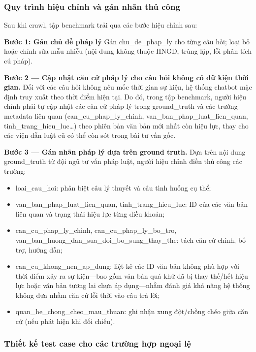 \documentclass[../DoAn.tex]{subfiles}
\begin{document}
\subsubsection{Quy trình hiệu chỉnh và gán nhãn thủ công}

Sau khi crawl, tập benchmark trải qua các bước hiệu chỉnh sau:

\textbf{Bước 1: Gán chủ đề pháp lý}
Gán chu\_de\_phap\_ly cho từng câu hỏi; loại bỏ hoặc chỉnh sửa mẫu nhiễu (nội dung không thuộc HNGĐ, trùng lặp, lỗi phân tích cú pháp).

\textbf{Bước 2 --- Cập nhật căn cứ pháp lý cho câu hỏi không có dữ kiện thời gian.}
Đối với các câu hỏi không nêu mốc thời gian sự kiện, hệ thống chatbot mặc định truy xuất theo thời điểm hiện tại. Do đó, trong tập benchmark, người hiệu chỉnh phải tự cập nhật các căn cứ pháp lý trong ground\_truth và các trường metadata liên quan (can\_cu\_phap\_ly\_chinh, van\_ban\_phap\_luat\_lien\_quan, tinh\_trang\_hieu\_luc\ldots) theo phiên bản văn bản mới nhất còn hiệu lực, thay cho các viện dẫn luật cũ có thể còn sót trong bài tư vấn gốc.

\textbf{Bước 3 --- Gán nhãn pháp lý dựa trên ground truth.}
Dựa trên nội dung ground\_truth từ đội ngũ tư vấn pháp luật, người hiệu chỉnh điền thủ công các trường:
\begin{itemize}
    \item loai\_cau\_hoi: phân biệt câu lý thuyết và câu tình huống cụ thể;
    \item van\_ban\_phap\_luat\_lien\_quan, tinh\_trang\_hieu\_luc: ID của các văn bản liên quan và trạng thái hiệu lực từng điều khoản;
    \item can\_cu\_phap\_ly\_chinh, can\_cu\_phap\_ly\_bo\_tro, \\ van\_ban\_huong\_dan\_sua\_doi\_bo\_sung\_thay\_the: tách căn cứ chính, bổ trợ, hướng dẫn;
    \item can\_cu\_khong\_nen\_ap\_dung: liệt kê các ID văn bản không phù hợp với thời điểm xảy ra sự kiện---bao gồm văn bản quá khứ đã bị thay thế/hết hiệu lực hoặc văn bản tương lai chưa áp dụng---nhằm đánh giá khả năng hệ thống không đưa nhầm căn cứ lỗi thời vào câu trả lời;
    \item quan\_he\_chong\_cheo\_mau\_thuan: ghi nhận xung đột/chồng chéo giữa căn cứ (nếu phát hiện khi đối chiếu).
\end{itemize}

\subsubsection{Thiết kế test case cho các trường hợp ngoại lệ}
\end{document}
